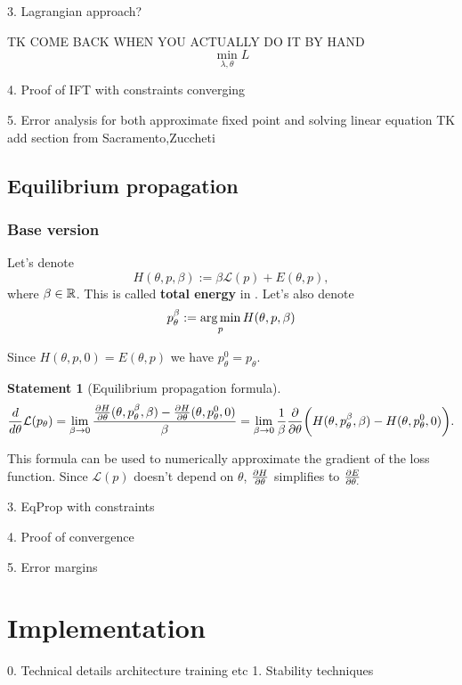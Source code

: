 \documentclass[a4paper,10pt]{report}
\newtheorem{statement}{Statement}
\begin{document}
3. Lagrangian approach?

TK COME BACK WHEN YOU ACTUALLY DO IT BY HAND
 \begin{equation}
\min_{\lambda,\theta} L
 \end{equation}

4. Proof of IFT with constraints converging

5. Error analysis for both approximate fixed point and solving linear equation
TK add section from Sacramento,Zuccheti
\subsection{ Equilibrium propagation}

\subsubsection{Base version}

Let's denote
\begin{equation}
H(\theta, p, \beta) := \beta \mathcal{L}(p) + E(\theta, p),
\end{equation}
where $\beta \in \mathbb{R}$.
 This is called \textbf{total energy} in \cite{eqprop}. Let's also denote
\begin{equation}
p_{\theta}^{\beta}:=\operatorname*{arg\,min}_p H(\theta, p, \beta)
\end{equation}


Since $H(\theta,p,0) = E(\theta,p)$ we have $p_{\theta}^{0}=p_{\theta}$.

\begin{statement}[Equilibrium propagation formula]
 \begin{equation}
 \frac{d}{d\theta} \mathcal{L}(p_\theta) = \lim_{\beta \to 0} \frac{\frac{\partial H}{\partial \theta}(\theta, p_\theta^\beta, \beta)-\frac{\partial H}{\partial \theta}(\theta, p_\theta^0, 0) }{\beta} = \lim_{\beta \to 0}\frac{1}{\beta} \frac{\partial }{\partial \theta} \bigg(H(\theta, p_\theta^\beta,\beta) - H(\theta, p_\theta^0, 0)\bigg).
\end{equation}
\end{statement}
This formula can be used to numerically approximate the gradient of the loss function.
Since $\mathcal{L}(p)$ doesn't depend on $\theta$, $\frac{\partial H}{\partial \theta}$ simplifies to $\frac{\partial E}{\partial \theta.}$

3. EqProp with constraints



4. Proof of convergence

5. Error margins
\section{ Implementation}
0. Technical details
    architecture
    training
    etc
1. Stability techniques
\end{document}
